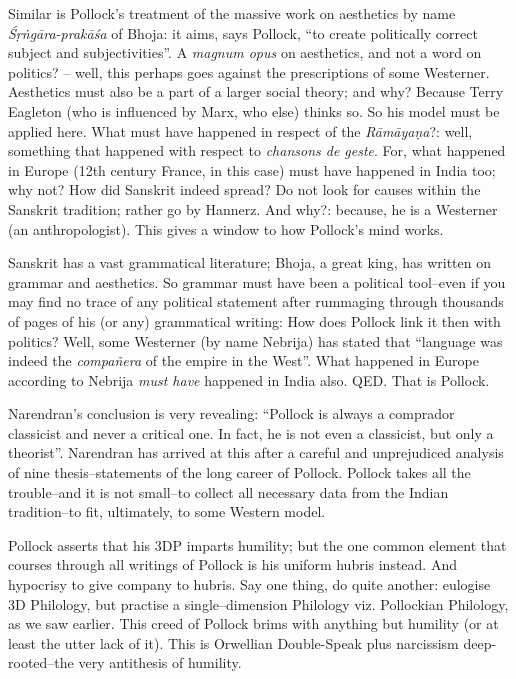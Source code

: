Similar is Pollock’s treatment of the massive work on aesthetics by name \textit{Śṛṅgāra-prakāśa} of Bhoja: it aims, says Pollock, “to create politically correct subject and subjectivities”. A \textit{magnum opus} on aesthetics, and not a word on politics? – well, this perhaps goes against the prescriptions of some Westerner. Aesthetics must also be a part of a larger social theory; and why? Because Terry Eagleton (who is influenced by Marx, who else) thinks so. So his model must be applied here. What must have happened in respect of the \textit{Rāmāyaṇa}?: well, something that happened with respect to \textit{chansons de geste}. For, what happened in Europe (12th century France, in this case) must have happened in India too; why not? How did Sanskrit indeed spread? Do not look for causes within the Sanskrit tradition; rather go by Hannerz. And why?: because, he is a Westerner (an anthropologist). This gives a window to how Pollock’s mind works.

\newpage

Sanskrit has a vast grammatical literature; Bhoja, a great king, has written on grammar and aesthetics. So grammar must have been a political tool–even if you may find no trace of any political statement after rummaging through thousands of pages of his (or any) grammatical writing: How does Pollock link it then with politics? Well, some Westerner (by name Nebrija) has stated that “language was indeed the \textit{compañera} of the empire in the West”. What happened in Europe according to Nebrija \textit{must have} happened in India also. QED. That is Pollock.

Narendran’s conclusion is very revealing: “Pollock is always a comprador classicist and never a critical one. In fact, he is not even a classicist, but only a theorist”. Narendran has arrived at this after a careful and unprejudiced analysis of nine thesis–statements of the long career of Pollock. Pollock takes all the trouble–and it is not small–to collect all necessary data from the Indian tradition–to fit, ultimately, to some Western model.

Pollock asserts that his 3DP imparts humility; but the one common element that courses through all writings of Pollock is his uniform hubris instead. And hypocrisy to give company to hubris. Say one thing, do quite another: eulogise 3D Philology, but practise a single–dimension Philology viz. Pollockian Philology, as we saw earlier. This creed of Pollock brims with anything but humility (or at least the utter lack of it). This is Orwellian Double-Speak plus narcissism deep-rooted–the very antithesis of humility.

